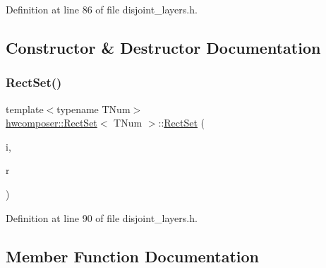 Definition at line 86 of file disjoint\+\_\+layers.\+h.



\subsection{Constructor \& Destructor Documentation}
\mbox{\label{structhwcomposer_1_1RectSet_aac7c9adf4733e181912dcb3ae1125921}} 
\subsubsection{\texorpdfstring{Rect\+Set()}{RectSet()}}
{\footnotesize\ttfamily template$<$typename T\+Num$>$ \\
\mbox{\hyperlink{structhwcomposer_1_1RectSet}{hwcomposer\+::\+Rect\+Set}}$<$ T\+Num $>$\+::\mbox{\hyperlink{structhwcomposer_1_1RectSet}{Rect\+Set}} (\begin{DoxyParamCaption}\item[{const \mbox{\hyperlink{structhwcomposer_1_1RectIDs}{Rect\+I\+Ds}} \&}]{i,  }\item[{const \mbox{\hyperlink{structhwcomposer_1_1Rect}{Rect}}$<$ T\+Num $>$ \&}]{r }\end{DoxyParamCaption})\hspace{0.3cm}{\ttfamily [inline]}}



Definition at line 90 of file disjoint\+\_\+layers.\+h.


\begin{DoxyCode}{0}
\end{DoxyCode}


\subsection{Member Function Documentation}
\mbox{\label{structhwcomposer_1_1RectSet_a1f00bb9520861c8b73f2cde21a71b211}} 
